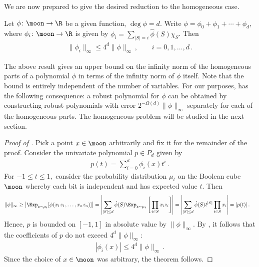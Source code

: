 We are now prepared to give the desired reduction to
the homogeneous case. 

\begin{theorem}
\label{thm:rebuild-from-levels}
Let $\phi\colon\moon\to\R$ be a given function, $\deg \phi=d$.
Write $\phi=\phi_0+\phi_1+\cdots+\phi_d,$ where 
$\phi_i\colon\moon\to\R$ is given
by $\phi_i=\sum_{|S|=i}\hat\phi(S)\chi_S$. Then
\begin{align*}
\|\phi_i\|_\infty \leq 4^d \|\phi\|_\infty\,, \qquad
i=0,1,\dots,d\,.
\end{align*}
\end{theorem}

The above result gives an upper bound on the infinity
norm of the homogeneous parts of a polynomial $\phi$ in
terms of the infinity norm of $\phi$ itself.  Note that the bound
is entirely independent of the number of variables. 
For our purposes, 
has the following consequence: a robust 
polynomial for $\phi$ can be obtained
by constructing robust polynomials with 
error $2^{-\Omega(d)}\|\phi\|_\infty$ 
separately for each of the homogeneous parts. The
homogeneous problem will be studied in the next section.


\begin{proof}[Proof of ]
Pick a point $x\in\moon$ arbitrarily and fix it for the
remainder of the proof. Consider the univariate
polynomial $p\in P_d$ given by
\begin{align*}
p(t) = \sum_{i=0}^d \phi_i(x)t^i\,.
\end{align*}
For $-1\leq t\leq1,$ consider the probability
distribution $\mu_t$ on the Boolean cube $\moon$
whereby each bit is independent and has expected value
$t$. Then 
\begin{align*}
\|\phi\|_\infty
&\geq
\left\lvert\Exp_{z\sim\mu_t}[\phi(x_1z_1,\dots,x_nz_n)]\right\rvert
=
\left\lvert
\sum_{|S|\leq d} \hat\phi(S)
\Exp_{z\sim\mu_t}\left[\,\prod_{i\in S} x_iz_i\right]\right\rvert
=
\left\lvert
\sum_{|S|\leq d} \hat\phi(S)
t^{|S|} \prod_{i\in S} x_i\right\rvert
=
|p(t)|\,.
\end{align*}
Hence, $p$ is bounded on $[-1,1]$  in absolute value by
$\|\phi\|_\infty$. By
, it follows that the
coefficients of $p$ do not exceed
$4^d\|\phi\|_\infty$:
\begin{align*}
|\phi_i(x)|\leq 4^d\|\phi\|_\infty\,.
\end{align*}
Since the choice of $x\in\moon$ was arbitrary, the
theorem follows.
\end{proof}




